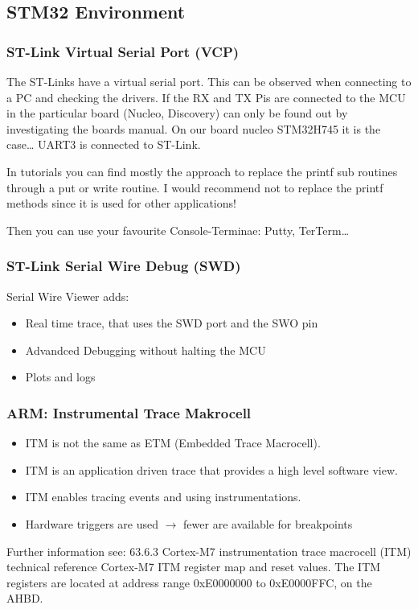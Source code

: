 \subsection{STM32 Environment}
\subsubsection{ST-Link Virtual Serial Port (VCP)}
\begin{paracol}{2}
    The ST-Links have a virtual serial port.
    This can be observed when connecting to a PC and checking the drivers.
    If the RX and TX Pis are connected to the MCU in the particular board (Nucleo, Discovery) can only be found out by investigating the boards manual.
    On our board nucleo STM32H745 it is the case… UART3 is connected to ST-Link.

    In tutorials you can find mostly the approach to replace the printf sub routines through a put or write routine.
    I would recommend not to replace the printf methods since it is used for other applications!

    Then you can use your favourite Console-Terminae: Putty, TerTerm…
    \switchcolumn
    
\end{paracol}

\subsubsection{ST-Link Serial Wire Debug (SWD)}
Serial Wire Viewer adds:
\begin{itemize}
    \item Real time trace, that uses the SWD port and the SWO pin
    \item Advandced Debugging without halting the MCU
    \item Plots and logs
\end{itemize}

\subsubsection{ARM: Instrumental Trace Makrocell}
\begin{itemize}
    \item ITM is not the same as ETM (Embedded Trace Macrocell).
    \item ITM is an application driven trace that provides a high level software view.
    \item ITM enables tracing events and using instrumentations.
    \item Hardware triggers are used $\rightarrow$ fewer are available for breakpoints
\end{itemize}
Further information see: 63.6.3 Cortex-M7 instrumentation trace macrocell (ITM) technical reference Cortex-M7 ITM register map and reset values.
The ITM registers are located at address range 0xE0000000 to 0xE0000FFC, on the AHBD.

